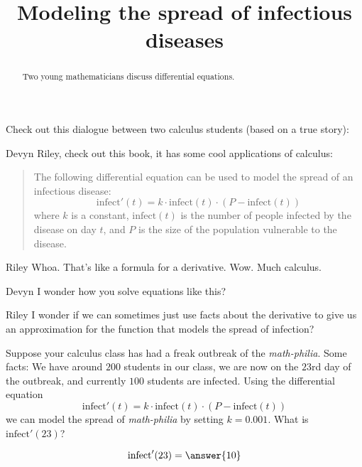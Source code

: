 \documentclass{ximera}
\title[Break-Ground:]{Modeling the spread of infectious diseases}
\begin{document}
\begin{abstract}
  Two young mathematicians discuss differential equations.
\end{abstract}
\maketitle







Check out this dialogue between two calculus students (based on a true
story):

\begin{dialogue}
\item[Devyn] Riley, check out this book, it has some cool applications
  of calculus:
\begin{quote}
  The following differential equation can be used to model the spread
  of an infectious disease:
  \[
  \mathrm{infect}'(t) = k\cdot \mathrm{infect}(t)\cdot (P-\mathrm{infect}(t))
  \]
  where $k$ is a constant, $\mathrm{infect}(t)$ is the number of people
  infected by the disease on day $t$, and $P$ is the size of the
  population vulnerable to the disease.
\end{quote}
\item[Riley] Whoa. That's like a formula for a derivative. Wow. Much calculus. 
\item[Devyn] I wonder how you solve equations like this?
\item[Riley] I wonder if we can sometimes just use facts about the
  derivative to give us an approximation for the function that models the spread of infection?
\end{dialogue}



\begin{problem}
  Suppose your calculus class has had a freak outbreak of the
  \textit{math-philia}. Some facts: We have around $200$ students in
  our class, we are now on the $23$rd day of the outbreak, and currently $100$ students are infected. Using the differential
  equation
  \[
  \mathrm{infect}'(t) = k\cdot \mathrm{infect}(t)\cdot (P-\mathrm{infect}(t))
  \]
  we can model the spread of \textit{math-philia} by setting $k=0.001$.
  What is $\mathrm{infect}'(23)$?
  \begin{prompt}
    \[
    \mathrm{infect}'(23) = \answer{10}
    \]
  \end{prompt}
\end{problem}
\end{document}
